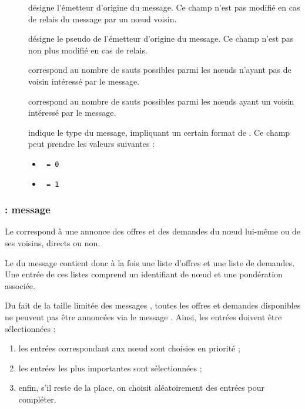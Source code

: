 \begin{description}
	\item[\fkfrom] désigne l'émetteur d'origine du message. Ce champ n'est pas modifié en cas de relais du message par un n\oe ud voisin.
	\item[\fknick] désigne le pseudo de l'émetteur d'origine du message. Ce champ n'est pas non plus modifié en cas de relais.
	\item[\fkttl] correspond au nombre de sauts possibles parmi les n\oe uds n'ayant pas de voisin intéressé par le message.
	\item[\fktts] correspond au nombre de sauts possibles parmi les n\oe uds ayant un voisin intéressé par le message.
	\item[\fktype] indique le type du message, impliquant un certain format de \payload. Ce champ peut prendre les valeurs suivantes :
		\begin{itemize}
			\item \texttt{\msgheartbeat{} = 0}
			\item \texttt{\msgpie{} = 1}
		\end{itemize}
\end{description}

\format{\ffrom \apgdelim \fnick \apgdelim \fttl \apgdelim \ftts \apgdelim \\ \ftype \apgdelim \fvpayload}


\subsubsection{\Payload : message \msgheartbeat}

Le \msgheartbeat{} correspond à une annonce des offres et des demandes du n\oe ud lui-même ou de ses voisins, directs ou non.

Le \payload{} du message contient donc à la fois une liste d'offres et une liste de demandes.
Une entrée de ces listes comprend un identifiant de n\oe ud et une pondération associée.

Du fait de la taille limitée des messages \airplug, toutes les offres et demandes disponibles ne peuvent pas être annoncées via le message \msgheartbeat.
Ainsi, les entrées doivent être sélectionnées :

\begin{enumerate}
	\item les entrées correspondant aux n\oe ud sont choisies en priorité ;
	\item les entrées les plus importantes sont sélectionnées ;
	\item enfin, s'il reste de la place, on choisit aléatoirement des entrées pour compléter.
\end{enumerate}

